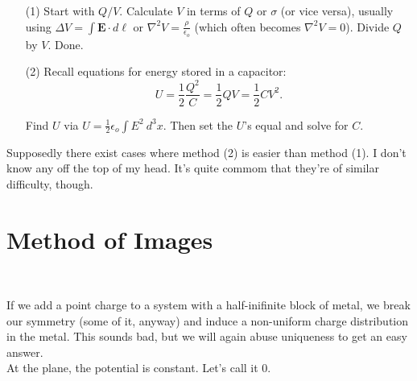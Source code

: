 \documentclass{article}
\begin{document}
\begin{enumerate}

\item[(1)] Start with $Q/V$. Calculate $V$ in terms of $Q$ or $\sigma$ (or vice versa), usually using $\displaystyle \Delta V = \int \bm{E} \cdot d\bm{\ell}$ or $\displaystyle \nabla^2 V = \frac{\rho}{\epsilon_o}$ (which often becomes $\displaystyle \nabla^2 V = 0$). Divide $Q$ by $V$. Done.

\item[(2)] Recall equations for energy stored in a capacitor:
\begin{equation*}
	U = \frac{1}{2} \frac{Q^2}{C} = \frac{1}{2} Q V = \frac{1}{2} C V^2.
\end{equation*}

Find $U$ via $\displaystyle U = \frac{1}{2} \epsilon_o \int E^2\ d^3x$. Then set the $U$'s equal and solve for $C$.

\end{enumerate}

Supposedly there exist cases where method (2) is easier than method (1). I don't know any off the top of my head. It's quite commom that they're of similar difficulty, though.

\section*{Method of Images}

\begin{minipage}{0.45\textwidth}
\begin{figure}[H]
\centering
{}
\end{figure}
\end{minipage}
~
\begin{minipage}{0.50\textwidth}
If we add a point charge to a system with a half-inifinite block of metal, we break our symmetry (some of it, anyway) and induce a non-uniform charge distribution in the metal. This sounds bad, but we will again abuse uniqueness to get an easy answer. \\[1em]
At the plane, the potential is constant. Let's call it 0.
\end{minipage}

\vspace{1em}
\end{document}
